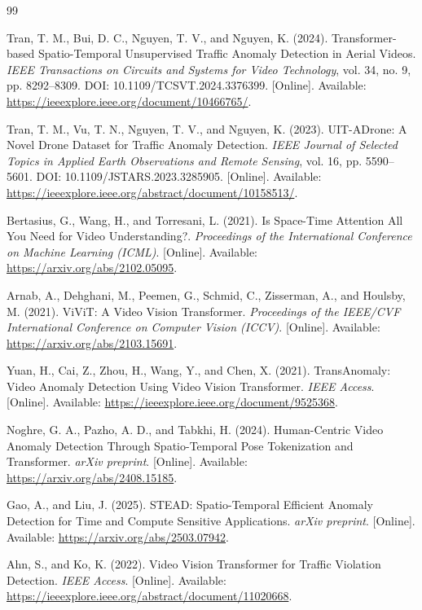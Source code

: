 \begin{thebibliography}{99}

 Tran, T. M., Bui, D. C., Nguyen, T. V., and Nguyen, K. (2024). Transformer-based Spatio-Temporal Unsupervised Traffic Anomaly Detection in Aerial Videos. \textit{IEEE Transactions on Circuits and Systems for Video Technology}, vol. 34, no. 9, pp. 8292--8309. DOI: 10.1109/TCSVT.2024.3376399. [Online]. Available: \url{https://ieeexplore.ieee.org/document/10466765/}.

 Tran, T. M., Vu, T. N., Nguyen, T. V., and Nguyen, K. (2023). UIT-ADrone: A Novel Drone Dataset for Traffic Anomaly Detection. \textit{IEEE Journal of Selected Topics in Applied Earth Observations and Remote Sensing}, vol. 16, pp. 5590--5601. DOI: 10.1109/JSTARS.2023.3285905. [Online]. Available: \url{https://ieeexplore.ieee.org/abstract/document/10158513/}.

 Bertasius, G., Wang, H., and Torresani, L. (2021). Is Space-Time Attention All You Need for Video Understanding?. \textit{Proceedings of the International Conference on Machine Learning (ICML)}. [Online]. Available: \url{https://arxiv.org/abs/2102.05095}.

 Arnab, A., Dehghani, M., Peemen, G., Schmid, C., Zisserman, A., and Houlsby, M. (2021). ViViT: A Video Vision Transformer. \textit{Proceedings of the IEEE/CVF International Conference on Computer Vision (ICCV)}. [Online]. Available: \url{https://arxiv.org/abs/2103.15691}.

 Yuan, H., Cai, Z., Zhou, H., Wang, Y., and Chen, X. (2021). TransAnomaly: Video Anomaly Detection Using Video Vision Transformer. \textit{IEEE Access}. [Online]. Available: \url{https://ieeexplore.ieee.org/document/9525368}.

 Noghre, G. A., Pazho, A. D., and Tabkhi, H. (2024). Human-Centric Video Anomaly Detection Through Spatio-Temporal Pose Tokenization and Transformer. \textit{arXiv preprint}. [Online]. Available: \url{https://arxiv.org/abs/2408.15185}.

 Gao, A., and Liu, J. (2025). STEAD: Spatio-Temporal Efficient Anomaly Detection for Time and Compute Sensitive Applications. \textit{arXiv preprint}. [Online]. Available: \url{https://arxiv.org/abs/2503.07942}.

 Ahn, S., and Ko, K. (2022). Video Vision Transformer for Traffic Violation Detection. \textit{IEEE Access}. [Online]. Available: \url{https://ieeexplore.ieee.org/abstract/document/11020668}.


\end{thebibliography}
